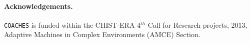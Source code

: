 \documentclass{llncs}
\def\coaches{{\tt COACHES} }
\begin{document}








\paragraph{\bf  Acknowledgements.}

\coaches is funded within the CHIST-ERA 4$^{th}$ Call for Research projects, 2013,
Adaptive Machines in Complex Environments (AMCE) Section.




\end{document}
